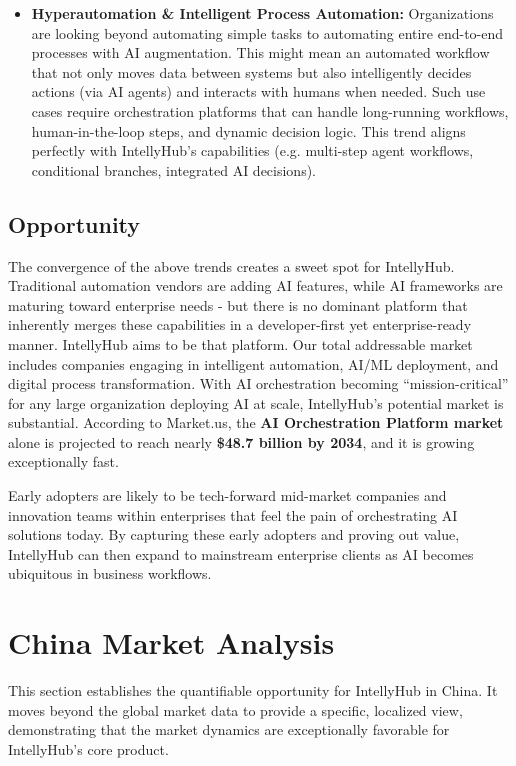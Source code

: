 \documentclass[11pt, a4paper, oneside]{article}
\begin{document}
\begin{itemize}
    \item \textbf{Hyperautomation \& Intelligent Process Automation:} Organizations are looking beyond automating simple tasks to automating entire end-to-end processes with AI augmentation. This might mean an automated workflow that not only moves data between systems but also intelligently decides actions (via AI agents) and interacts with humans when needed. Such use cases require orchestration platforms that can handle long-running workflows, human-in-the-loop steps, and dynamic decision logic. This trend aligns perfectly with IntellyHub's capabilities (e.g. multi-step agent workflows, conditional branches, integrated AI decisions).
\end{itemize}

\subsection{Opportunity}
The convergence of the above trends creates a sweet spot for IntellyHub. Traditional automation vendors are adding AI features, while AI frameworks are maturing toward enterprise needs - but there is no dominant platform that inherently merges these capabilities in a developer-first yet enterprise-ready manner. IntellyHub aims to be that platform. Our total addressable market includes companies engaging in intelligent automation, AI/ML deployment, and digital process transformation. With AI orchestration becoming “mission-critical” for any large organization deploying AI at scale, IntellyHub's potential market is substantial. According to Market.us, the \textbf{AI Orchestration Platform market} alone is projected to reach nearly \textbf{\$48.7 billion by 2034}\cite{AIOrch}, and it is growing exceptionally fast. 

Early adopters are likely to be tech-forward mid-market companies and innovation teams within enterprises that feel the pain of orchestrating AI solutions today. By capturing these early adopters and proving out value, IntellyHub can then expand to mainstream enterprise clients as AI becomes ubiquitous in business workflows.

\section{China Market Analysis}
This section establishes the quantifiable opportunity for IntellyHub in China. It moves beyond the global market data to provide a specific, localized view, demonstrating that the market dynamics are exceptionally favorable for IntellyHub's core product.
\end{document}
